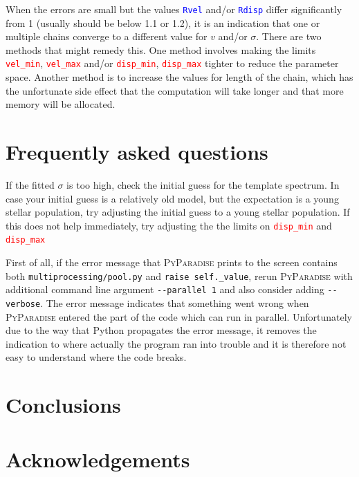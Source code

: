 \documentclass[usenatbib,usegraphicx,useAMS,onecolumn]{mn2e}
\newcommand{\codeline}[1]{\lstinline|#1|}
\newcommand{\paramdef}[1]{\textcolor{red}{\codeline{#1}}}
\newcommand{\tblcol}[1]{\textcolor{blue}{\codeline{#1}}}
\begin{document}
When the errors are small but the values \tblcol{Rvel} and/or \tblcol{Rdisp} differ significantly from 1 (usually should be below 1.1 or 1.2), it is an indication that one or multiple chains converge to a different value for $v$ and/or $\sigma$.
There are two methods that might remedy this.
One method involves making the limits \paramdef{vel_min}, \paramdef{vel_max} and/or \paramdef{disp_min}, \paramdef{disp_max} tighter to reduce the parameter space.
Another method is to increase the values for length of the chain, which has the unfortunate side effect that the computation will take longer and that more memory will be allocated.

\section{Frequently asked questions}
\begin{description}[font=\normalfont\itshape]
    \item [My velocity dispersion value is too high?]
        If the fitted $\sigma$ is too high, check the initial guess for the template spectrum.
        In case your initial guess is a relatively old model, but the expectation is a young stellar population, try adjusting the initial guess to a young stellar population.
        If this does not help immediately, try adjusting the the limits on \paramdef{disp_min} and \paramdef{disp_max}
    \item [\textsc{PyParadise} crashed during a run, what do I do now?]
        First of all, if the error message that \textsc{PyParadise} prints to the screen contains both \codeline{multiprocessing/pool.py} and \codeline{raise self._value}, rerun \textsc{PyParadise} with additional command line argument \codeline{--parallel 1} and also consider adding \codeline{--verbose}.
        The error message indicates that something went wrong when \textsc{PyParadise} entered the part of the code which can run in parallel.
        Unfortunately due to the way that Python propagates the error message, it removes the indication to where actually the program ran into trouble and it is therefore not easy to understand where the code breaks.
\end{description}

\section{Conclusions}
\label{sec:conclusions}

\section*{Acknowledgements}

%
%
\end{document}
